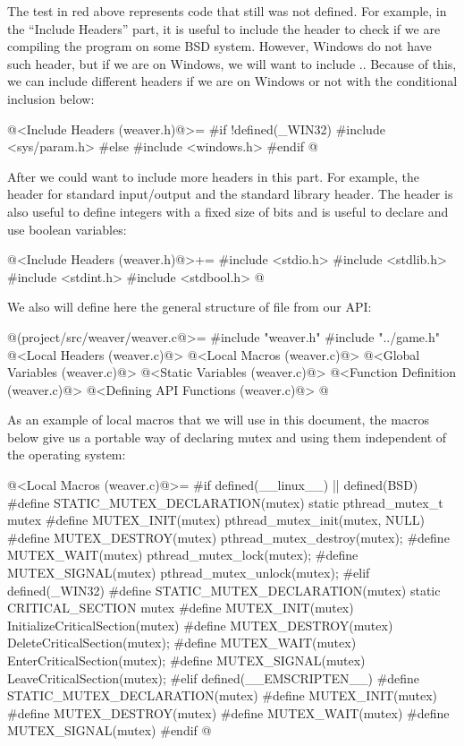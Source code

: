 The test in red above represents code that still was not defined. For
example, in the ``Include Headers'' part, it is useful to include the
header  to check if we are compiling the
program on some BSD system. However, Windows do not have such header,
but if we are on Windows, we will want to
include .. Because of this, we can include
different headers if we are  on Windows or not with the conditional
inclusion below:

\iniciocodigo
@<Include Headers (weaver.h)@>=
#if !defined(_WIN32)
#include <sys/param.h>
#else
#include <windows.h>
#endif
@
\fimcodigo

After we could want to include more headers in this part. For example,
the header for standard input/output and the standard library
header. The header  is also useful to define
integers with a fixed size of bits and  is
useful to declare and use boolean variables:

\iniciocodigo
@<Include Headers (weaver.h)@>+=
#include <stdio.h>
#include <stdlib.h>
#include <stdint.h>
#include <stdbool.h>
@
\fimcodigo

We also will define here the general structure of
file  from our API:

\iniciocodigo
@(project/src/weaver/weaver.c@>=
#include "weaver.h"
#include "../game.h"
@<Local Headers (weaver.c)@>
@<Local Macros (weaver.c)@>
@<Global Variables (weaver.c)@>
@<Static Variables (weaver.c)@>
@<Function Definition (weaver.c)@>
@<Defining API Functions (weaver.c)@>
@
\fimcodigo

As an example of local macros that we will use in this document, the
macros below give us a portable way of declaring mutex and using them
independent of the operating system:

\iniciocodigo
@<Local Macros (weaver.c)@>=
#if defined(__linux__) || defined(BSD)
#define STATIC_MUTEX_DECLARATION(mutex) static pthread_mutex_t mutex
#define MUTEX_INIT(mutex) pthread_mutex_init(mutex, NULL)
#define MUTEX_DESTROY(mutex) pthread_mutex_destroy(mutex);
#define MUTEX_WAIT(mutex) pthread_mutex_lock(mutex);
#define MUTEX_SIGNAL(mutex) pthread_mutex_unlock(mutex);
#elif defined(_WIN32)
#define STATIC_MUTEX_DECLARATION(mutex) static CRITICAL_SECTION mutex
#define MUTEX_INIT(mutex) InitializeCriticalSection(mutex)
#define MUTEX_DESTROY(mutex) DeleteCriticalSection(mutex);
#define MUTEX_WAIT(mutex) EnterCriticalSection(mutex);
#define MUTEX_SIGNAL(mutex) LeaveCriticalSection(mutex);
#elif defined(__EMSCRIPTEN__)
#define STATIC_MUTEX_DECLARATION(mutex)
#define MUTEX_INIT(mutex)
#define MUTEX_DESTROY(mutex)
#define MUTEX_WAIT(mutex)
#define MUTEX_SIGNAL(mutex)
#endif
@
\fimcodigo

